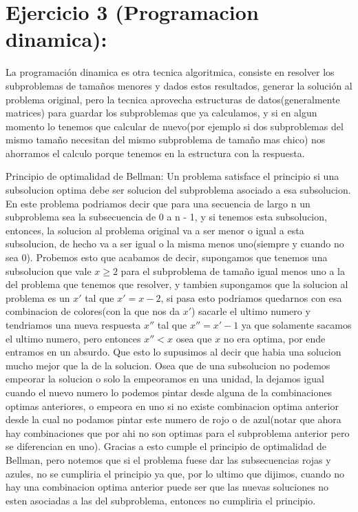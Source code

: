 \section{Ejercicio 3 (Programacion dinamica):}
La programación dinamica es otra tecnica algoritmica, consiste en resolver los subproblemas de tamaños menores y dados estos resultados, generar la solución al problema original, pero la tecnica aprovecha estructuras de datos(generalmente matrices) para guardar los subproblemas que ya calculamos, y si en algun momento lo tenemos que calcular de nuevo(por ejemplo si dos subproblemas del mismo tamaño necesitan del mismo subproblema de tamaño mas chico) nos ahorramos el calculo porque tenemos en la estructura con la respuesta.


Principio de optimalidad de Bellman:
Un problema satisface el principio si una subsolucion optima debe ser solucion del subproblema asociado a esa subsolucion. En este problema podriamos decir que para una secuencia de largo n un subproblema sea la subsecuencia de 0 a n - 1, y si tenemos esta subsolucion, entonces, la solucion al problema original va a ser menor o igual a esta subsolucion, de hecho va a ser igual o la misma menos uno(siempre y cuando no sea 0). Probemos esto que acabamos de decir, supongamos que tenemos una subsolucion que vale $x \geq 2$ para el subproblema de tamaño igual menos uno a la del problema que tenemos que resolver, y tambien supongamos que la solucion al problema es un $x'$ tal que $x' = x - 2$, si pasa esto podriamos quedarnos con esa combinacion de colores(con la que nos da $x'$) sacarle el ultimo numero y tendriamos una nueva respuesta $x''$ tal que $x'' = x'-1$ ya que solamente sacamos el ultimo numero, pero entonces $x'' < x$ osea que $x$ no era optima, por ende entramos en un absurdo. Que esto lo supusimos al decir que habia una solucion mucho mejor que la de la solucion. Osea que de una subsolucion no podemos empeorar la solucion o solo la empeoramos en una unidad, la dejamos igual cuando el nuevo numero lo podemos pintar desde alguna de la combinaciones optimas anteriores, o empeora en uno si no existe combinacion optima anterior desde la cual no podamos pintar este numero de rojo o de azul(notar que ahora hay combinaciones que por ahi no son optimas para el subproblema anterior pero se diferencian en uno). Gracias a esto cumple el principio de optimalidad de Bellman, pero notemos que si el problema fuese dar las subsecuencias rojas y azules, no se cumpliria el principio ya que, por lo ultimo que dijimos, cuando no hay una combinacion optima anterior puede ser que las nuevas soluciones no esten asociadas a las del subproblema, entonces no cumpliria el principio.

